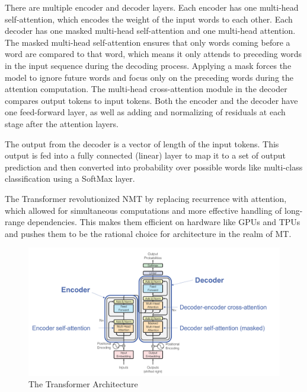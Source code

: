 There are multiple encoder and decoder layers. 
Each encoder has one multi-head self-attention, which encodes the weight of the input words to each other. 
Each decoder has one masked multi-head self-attention and one multi-head attention. The masked multi-head self-attention ensures that only words coming before a word are compared to that word, which means it only attends to preceding words in the input sequence during the decoding process. Applying a mask forces the model to ignore future words and focus only on the preceding words during the attention computation. %
The multi-head cross-attention module in the decoder compares output tokens to input tokens.
Both the encoder and the decoder have one feed-forward layer, as well as adding and normalizing of residuals at each stage after the attention layers.

The output from the decoder is a vector of length of the input tokens. This output is fed into a fully connected (linear) layer to map it to a set of output prediction and then converted into probability over possible words like multi-class classification using a SoftMax layer.


The Transformer revolutionized NMT by replacing recurrence with attention, which allowed for simultaneous computations and more effective handling of long-range dependencies. This makes them efficient on hardware like GPUs and TPUs and pushes them to be the rational choice for architecture in the realm of MT.

\begin{figure}
  \centering
  \includegraphics[scale=0.5]{figures/transformer.png}
  \caption{The Transformer Architecture}
  \label{fig:transformer}
\end{figure}

